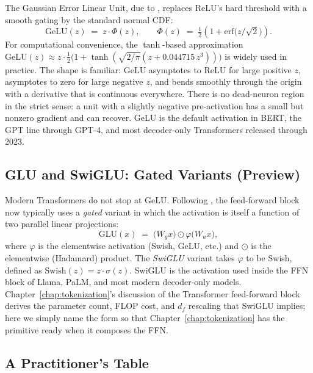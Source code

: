 The Gaussian Error Linear Unit, due to
\citet{hendrycks2016gelu}, replaces ReLU's hard threshold with a
smooth gating by the standard normal CDF:
\begin{equation}
  \mathrm{GeLU}(z) \;=\; z \cdot \Phi(z),
  \qquad
  \Phi(z) \;=\; \tfrac{1}{2}\!\left(1 + \mathrm{erf}\!\bigl(z/\sqrt{2}\bigr)\right).
  \label{eq:nn-gelu}
\end{equation}
For computational convenience, the
$\tanh$-based approximation
$\mathrm{GeLU}(z) \approx z \cdot \tfrac{1}{2}\bigl(1 + \tanh(\sqrt{2/\pi}(z + 0.044715\,z^3))\bigr)$
is widely used in practice. The shape is familiar: GeLU
asymptotes to ReLU for large positive $z$, asymptotes to zero
for large negative $z$, and bends smoothly through the origin
with a derivative that is continuous everywhere. There is no
dead-neuron region in the strict sense: a unit with a slightly
negative pre-activation has a small but nonzero gradient and can
recover. GeLU is the default activation in BERT, the GPT line
through GPT-4, and most decoder-only Transformers released
through 2023.

\subsection{GLU and SwiGLU: Gated Variants (Preview)}

Modern Transformers do not stop at GeLU. Following
\citet{shazeer2020glu}, the feed-forward block now typically uses
a \emph{gated} variant in which the activation is itself a
function of two parallel linear projections:
\begin{equation}
  \mathrm{GLU}(x) \;=\; \bigl(W_g x\bigr) \odot \varphi\!\bigl(W_u x\bigr),
  \label{eq:nn-glu}
\end{equation}
where $\varphi$ is the elementwise activation (Swish, GeLU, etc.)
and $\odot$ is the elementwise (Hadamard) product. The
\emph{SwiGLU} variant takes $\varphi$ to be Swish, defined as
$\mathrm{Swish}(z) = z \cdot \sigma(z)$. SwiGLU is the activation
used inside the FFN block of Llama, PaLM, and most modern
decoder-only models. Chapter~\ref{chap:tokenization}'s discussion of the Transformer
feed-forward block derives the parameter count, FLOP cost, and
$d_f$ rescaling that SwiGLU implies; here we simply name the
form so that Chapter~\ref{chap:tokenization} has the primitive ready when it composes
the FFN.

\subsection{A Practitioner's Table}

